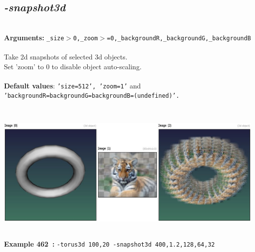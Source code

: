 \documentclass[a4paper,11pt,twoside]{book}
\begin{document}
\subsection{\emph{-snapshot3d} }\vspace*{-0.5em}
~\\\textbf{Arguments: } 
{\small \texttt{\_size$>$0,\_zoom$>$=0,\_backgroundR,\_backgroundG,\_backgroundB}}\\~\\
Take 2d snapshots of selected 3d objects.
~\\Set 'zoom' to 0 to disable object auto-scaling.
~\\~\\\textbf{Default values}: {\small \texttt{'size=512', 'zoom=1'} and \texttt{'backgroundR=backgroundG=backgroundB=(undefined)'.}}
\begin{center}\includegraphics[keepaspectratio=true,height=7cm,width=\textwidth]{img/gmic_def462.jpg}\\
{\footnotesize \textbf{Example 462~:} \texttt{-torus3d 100,20 -snapshot3d 400,1.2,128,64,32}}
\end{center}
\end{document}
